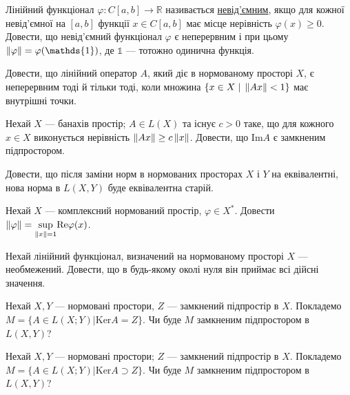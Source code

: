 
\begin{exercise}
    Лінійний функціонал $\varphi: C[a, b] \rightarrow \mathbb{R}$ називається \underline{невід'ємним},
    якщо для кожної невід'ємної на $[a ,b]$ функції $x \in C[a, b]$ має місце нерівність 
    $\varphi(x) \geq 0$. Довести, що невід'ємний функціонал $\varphi$ є неперервним і при цьому
    $\norm{\varphi} = \varphi(\mathds{1})$, де $\mathds{1}$ --- тотожно одинична функція.
\end{exercise}

\begin{exercise}
    Довести, що лінійний оператор $A$, який діє в нормованому просторі $X$, є неперервним тоді
    й тільки тоді, коли множина $\{x \in X \;|\; \left\lVert Ax\right\rVert < 1\}$ має внутрішні точки.
\end{exercise}

\begin{exercise}
    Нехай $X$ --- банахів простір; $A \in L(X)$ та існує $c > 0$ таке, що для кожного $x \in X$
    виконується нерівність $\left\lVert Ax\right\rVert \geq c \left\lVert x\right\rVert$. Довести, що $\mathrm{Im} A$ є замкненим підпростором.
\end{exercise}

\begin{exercise}
    Довести, що після заміни норм в нормованих просторах $X$ і $Y$ на еквівалентні,
    нова норма в $L\left( X, Y\right)$ буде еквівалентна старій.
\end{exercise}

\begin{exercise}
    Нехай $X$ --- комплексний нормований простір, $\varphi \in X^*$. Довести $\left\lVert\varphi\right\rVert = \underset{\left\lVert x\right\rVert=1}{\sup}\mathrm{Re}\varphi(x)$.
\end{exercise}

\begin{exercise}
    Нехай лінійний функціонал, визначений на нормованому просторі  $X$ --- необмежений.
    Довести, що в будь-якому околі нуля він приймає всі дійсні значення.
\end{exercise}

\begin{exercise}
    Нехай $X,Y$ --- нормовані простори, $Z$ --- замкнений підпростір в $X$. Покладемо 
    $M = \{A \in L(X;Y) | \mathrm{Ker} A = Z\}$. Чи буде $M$ замкненим підпростором в $L\left( X, Y\right)$?
\end{exercise}

\begin{exercise}
    Нехай $X,Y$ --- нормовані простори; $Z$ --- замкнений підпростір в $X$. Покладемо 
    $M = \{A \in L(X;Y) | \mathrm{Ker} A \supset Z\}$. Чи буде $M$ замкненим підпростором в $L\left( X, Y\right)$?
\end{exercise}

